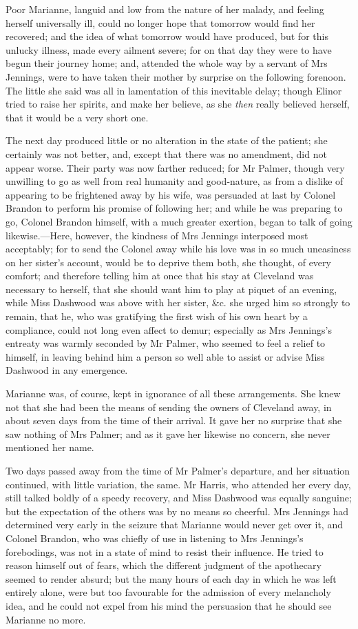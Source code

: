 Poor Marianne, languid and low from the nature of her malady, and feeling herself universally ill, could no longer hope that tomorrow would find her recovered; and the idea of what tomorrow would have produced, but for this unlucky illness, made every ailment severe; for on that day they were to have begun their journey home; and, attended the whole way by a servant of Mrs Jennings, were to have taken their mother by surprise on the following forenoon. The little she said was all in lamentation of this inevitable delay; though Elinor tried to raise her spirits, and make her believe, as she \textit{then} really believed herself, that it would be a very short one.

The next day produced little or no alteration in the state of the patient; she certainly was not better, and, except that there was no amendment, did not appear worse. Their party was now farther reduced; for Mr Palmer, though very unwilling to go as well from real humanity and good-nature, as from a dislike of appearing to be frightened away by his wife, was persuaded at last by Colonel Brandon to perform his promise of following her; and while he was preparing to go, Colonel Brandon himself, with a much greater exertion, began to talk of going likewise.—Here, however, the kindness of Mrs Jennings interposed most acceptably; for to send the Colonel away while his love was in so much uneasiness on her sister’s account, would be to deprive them both, she thought, of every comfort; and therefore telling him at once that his stay at Cleveland was necessary to herself, that she should want him to play at piquet of an evening, while Miss Dashwood was above with her sister, \&c. she urged him so strongly to remain, that he, who was gratifying the first wish of his own heart by a compliance, could not long even affect to demur; especially as Mrs Jennings’s entreaty was warmly seconded by Mr Palmer, who seemed to feel a relief to himself, in leaving behind him a person so well able to assist or advise Miss Dashwood in any emergence.

Marianne was, of course, kept in ignorance of all these arrangements. She knew not that she had been the means of sending the owners of Cleveland away, in about seven days from the time of their arrival. It gave her no surprise that she saw nothing of Mrs Palmer; and as it gave her likewise no concern, she never mentioned her name.

Two days passed away from the time of Mr Palmer’s departure, and her situation continued, with little variation, the same. Mr Harris, who attended her every day, still talked boldly of a speedy recovery, and Miss Dashwood was equally sanguine; but the expectation of the others was by no means so cheerful. Mrs Jennings had determined very early in the seizure that Marianne would never get over it, and Colonel Brandon, who was chiefly of use in listening to Mrs Jennings’s forebodings, was not in a state of mind to resist their influence. He tried to reason himself out of fears, which the different judgment of the apothecary seemed to render absurd; but the many hours of each day in which he was left entirely alone, were but too favourable for the admission of every melancholy idea, and he could not expel from his mind the persuasion that he should see Marianne no more.

